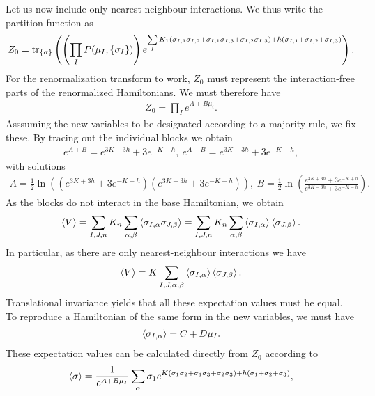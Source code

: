 Let us now include only nearest-neighbour interactions. We thus write the partition function as
\begin{align*}
	Z_{0} = \tr\limits_{\{\sigma\}}\left(\left(\prod\limits_{I}P(\mu_{I}, \{\sigma_{I}\})\right)e^{\sum\limits_{I}K_{1}(\sigma_{I, 1}\sigma_{I, 2} + \sigma_{I, 1}\sigma_{I, 3} + \sigma_{I, 2}\sigma_{I, 3}) + h(\sigma_{I, 1} + \sigma_{I, 2} + \sigma_{I, 3})}\right).
\end{align*}
For the renormalization transform to work, $Z_{0}$ must represent the interaction-free parts of the renormalized Hamiltonians. We must therefore have
\begin{align*}
	Z_{0} = \prod\limits_{I}e^{A + B\mu_{i}}.
\end{align*}
Asssuming the new variables to be designated according to a majority rule, we fix these. By tracing out the individual blocks we obtain
\begin{align*}
	e^{A + B} = e^{3K + 3h} + 3e^{-K + h},\ e^{A - B} = e^{3K - 3h} + 3e^{-K - h},
\end{align*}
with solutions
\begin{align*}
	A = \frac{1}{2}\ln((e^{3K + 3h} + 3e^{-K + h})(e^{3K - 3h} + 3e^{-K - h})),\ B = \frac{1}{2}\ln(\frac{e^{3K + 3h} + 3e^{-K + h}}{e^{3K - 3h} + 3e^{-K - h}}).
\end{align*}
As the blocks do not interact in the base Hamiltonian, we obtain
\begin{align*}
	\expval{V} = \sum\limits_{I, J, n}K_{n}\sum\limits_{\alpha, \beta}\expval{\sigma_{I, \alpha}\sigma_{J, \beta}} = \sum\limits_{I, J, n}K_{n}\sum\limits_{\alpha, \beta}\expval{\sigma_{I, \alpha}}\expval{\sigma_{J, \beta}}.
\end{align*}
In particular, as there are only nearest-neighbour interactions we have
\begin{align*}
	\expval{V} = K\sum\limits_{I, J, \alpha, \beta}\expval{\sigma_{I, \alpha}}\expval{\sigma_{J, \beta}}.
\end{align*}
Translational invariance yields that all these expectation values must be equal. To reproduce a Hamiltonian of the same form in the new variables, we must have
\begin{align*}
	\expval{\sigma_{I, \alpha}} = C + D\mu_{I}.
\end{align*}
These expectation values can be calculated directly from $Z_{0}$ according to
\begin{align*}
	\expval{\sigma} = \frac{1}{e^{A + B\mu_{I}}}\sum\limits_{\alpha}\sigma_{1}e^{K(\sigma_{1}\sigma_{2} + \sigma_{1}\sigma_{3} + \sigma_{2}\sigma_{3}) + h(\sigma_{1} + \sigma_{2} + \sigma_{3})},
\end{align*}
